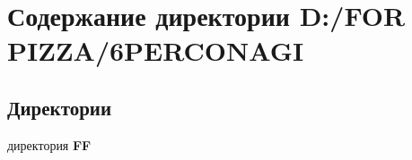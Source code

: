 \section{Содержание директории D\+:/\+F\+OR P\+I\+Z\+Z\+A/6\+P\+E\+R\+C\+O\+N\+A\+GI}
\label{dir_07dce545e38348ececb93cb6c7acb253}
\subsection*{Директории}
\begin{DoxyCompactItemize}
\item 
директория \textbf{ FF}
\end{DoxyCompactItemize}
